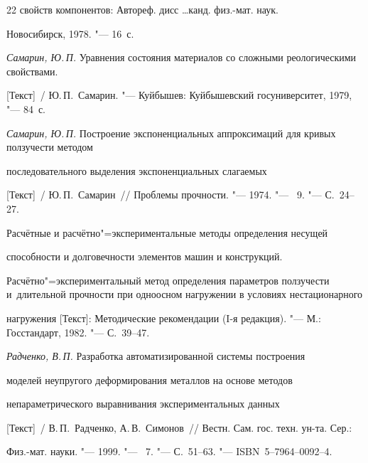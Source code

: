 \begin{thebibliography}{22}
свойств компонентов: Автореф. дисс \ldots канд. физ.-мат. наук. 

Новосибирск, 1978. "--- 16~с.



\item \textit{Самарин, Ю.\,П.} Уравнения состояния материалов со сложными реологическими свойствами. 

[Текст]~/ Ю.\,П.~Самарин. "--- Куйбышев: Куйбышевский госуниверситет, 1979, "---  84~с.



\item \textit{Самарин, Ю.\,П.} Построение экспоненциальных аппроксимаций для кривых ползучести методом 

последовательного выделения экспоненциальных слагаемых

[Текст]~/ Ю.\,П.~Самарин~/\!/ Проблемы прочности. "--- 1974. "--- \No~9. "---  С.~24--27.



\item Расчётные и расчётно"=экспериментальные методы определения несущей 

способности и долговечности элементов машин и конструкций. 

Расчётно"=экспериментальный метод определения параметров ползучести и~длительной прочности при одноосном нагружении в условиях нестационарного 

нагружения [Текст]: Методические рекомендации (I-я редакция). "--- М.: Госстандарт, 1982.  "--- С.~39--47.



\item \textit{Радченко, В.\,П.} Разработка автоматизированной системы построения 

моделей неупругого деформирования металлов на основе методов 

непараметрического выравнивания экспериментальных данных 

[Текст]~/ В.\,П.~Радченко, А.\,В.~Симонов~/\!/ Вестн. Сам. гос. техн. ун-та. Сер.: 

Физ.-мат. науки. "---  1999. "---  \No~7. "---  С.~51--63. "---  ISBN~5--7964--0092--4.



\end{thebibliography}



\vspace{7mm}

  \lfoot[]{}

  \rfoot[]{}





\makeengtitle











%

